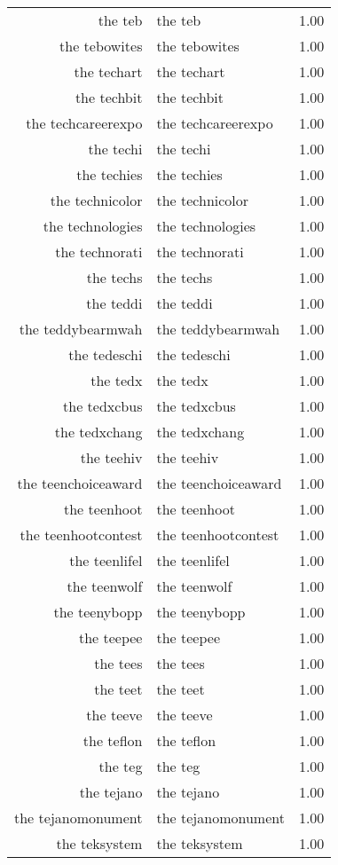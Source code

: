 \begin{table}[ht]
\begin{tabular}{rlr}
  the teb & the teb & 1.00 \\ 
  the tebowites & the tebowites & 1.00 \\ 
  the techart & the techart & 1.00 \\ 
  the techbit & the techbit & 1.00 \\ 
  the techcareerexpo & the techcareerexpo & 1.00 \\ 
  the techi & the techi & 1.00 \\ 
  the techies & the techies & 1.00 \\ 
  the technicolor & the technicolor & 1.00 \\ 
  the technologies & the technologies & 1.00 \\ 
  the technorati & the technorati & 1.00 \\ 
  the techs & the techs & 1.00 \\ 
  the teddi & the teddi & 1.00 \\ 
  the teddybearmwah & the teddybearmwah & 1.00 \\ 
  the tedeschi & the tedeschi & 1.00 \\ 
  the tedx & the tedx & 1.00 \\ 
  the tedxcbus & the tedxcbus & 1.00 \\ 
  the tedxchang & the tedxchang & 1.00 \\ 
  the teehiv & the teehiv & 1.00 \\ 
  the teenchoiceaward & the teenchoiceaward & 1.00 \\ 
  the teenhoot & the teenhoot & 1.00 \\ 
  the teenhootcontest & the teenhootcontest & 1.00 \\ 
  the teenlifel & the teenlifel & 1.00 \\ 
  the teenwolf & the teenwolf & 1.00 \\ 
  the teenybopp & the teenybopp & 1.00 \\ 
  the teepee & the teepee & 1.00 \\ 
  the tees & the tees & 1.00 \\ 
  the teet & the teet & 1.00 \\ 
  the teeve & the teeve & 1.00 \\ 
  the teflon & the teflon & 1.00 \\ 
  the teg & the teg & 1.00 \\ 
  the tejano & the tejano & 1.00 \\ 
  the tejanomonument & the tejanomonument & 1.00 \\ 
  the teksystem & the teksystem & 1.00 \\ 

\end{tabular}
\end{table}

